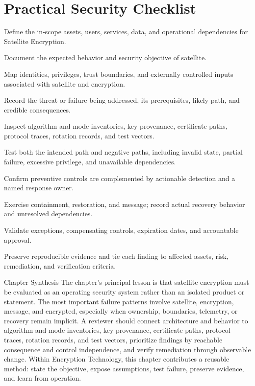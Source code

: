 \documentclass[11pt,letterpaper]{article}
\begin{document}
\section*{Practical Security Checklist}
\begin{CornellChecklist}
\item Define the in-scope assets, users, services, data, and operational dependencies for Satellite Encryption.
\item Document the expected behavior and security objective of satellite.
\item Map identities, privileges, trust boundaries, and externally controlled inputs associated with satellite and encryption.
\item Record the threat or failure being addressed, its prerequisites, likely path, and credible consequences.
\item Inspect algorithm and mode inventories, key provenance, certificate paths, protocol traces, rotation records, and test vectors.
\item Test both the intended path and negative paths, including invalid state, partial failure, excessive privilege, and unavailable dependencies.
\item Confirm preventive controls are complemented by actionable detection and a named response owner.
\item Exercise containment, restoration, and message; record actual recovery behavior and unresolved dependencies.
\item Validate exceptions, compensating controls, expiration dates, and accountable approval.
\item Preserve reproducible evidence and tie each finding to affected assets, risk, remediation, and verification criteria.
\end{CornellChecklist}
\begin{CornellSummaryBox}{Chapter Synthesis}
The chapter's principal lesson is that satellite encryption must be evaluated as an operating security system rather than an isolated product or statement. The most important failure patterns involve satellite, encryption, message, and encrypted, especially when ownership, boundaries, telemetry, or recovery remain implicit. A reviewer should connect architecture and behavior to algorithm and mode inventories, key provenance, certificate paths, protocol traces, rotation records, and test vectors, prioritize findings by reachable consequence and control independence, and verify remediation through observable change. Within Encryption Technology, this chapter contributes a reusable method: state the objective, expose assumptions, test failure, preserve evidence, and learn from operation.
\end{CornellSummaryBox}
\end{document}

